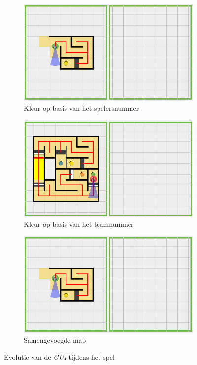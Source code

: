 \documentclass[eind]{penoverslag}
\begin{document}
\begin{figure}
\centering
	\begin{subfigure}[h]{0.8\textwidth}
		\includegraphics[width=\textwidth]{guiPlayerKleur}
		\caption{Kleur op basis van het spelersnummer}
	\end{subfigure}
	\begin{subfigure}[h]{0.8\textwidth}
		\includegraphics[width=\textwidth]{guiTeamKleur}
		\caption{Kleur op basis van het teamnummer}
	\end{subfigure}
	\begin{subfigure}[h]{0.8\textwidth}
		\includegraphics[width=\textwidth]{guiTeamMap}
		\caption{Samengevoegde map}
	\end{subfigure}
	\caption{Evolutie van de \textit{GUI} tijdens het spel}
	\label{fig:guiEvolutie}
\end{figure}
\end{document}
